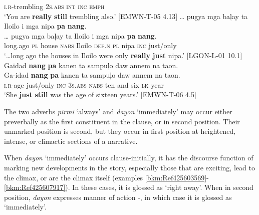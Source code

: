 {} \textsc{i.r}-trembling  2\textsc{s.abs}  \textsc{int}  \textsc{inc}  \textsc{emph} \\
\glt ‘You are \textbf{really} \textbf{still} trembling also.’ [EMWN-T-05 4.13]
\z
\ea
… pugya  mga  baļay  ta  Iloilo  i  mga  nipa  \textbf{pa}  \textbf{nang}. \\\smallskip
 \gll … pugya  mga  baļay  ta  Iloilo  i  mga  nipa  \textbf{pa}  \textbf{nang}. \\
 {} long.ago  \textsc{pl}  house  \textsc{nabs}  Iloilo  \textsc{def.n}  \textsc{pl}  nipa  \textsc{inc}  just/only \\
\glt ‘…long ago the houses in Iloilo were only \textbf{really} \textbf{just} nipa.’ [LGON-L-01 10.1]
\z
\ea
Gaidad  \textbf{nang}  \textbf{pa}  kanen  ta  sampuļo  daw  annem  na  taon. \\\smallskip
 \gll Ga-idad  \textbf{nang}  \textbf{pa}  kanen  ta  sampuļo  daw  annem  na  taon. \\
\textsc{i.r}-age  just/only  \textsc{inc}  3\textsc{s.abs}  \textsc{nabs}  ten  and  six    \textsc{lk}  year \\
\glt ‘She \textbf{just} \textbf{still} was the age of sixteen years.’ [EMWN-T-06 4.5]
\z

The two adverbs \textit{pirmi} ‘always’ and \textit{dayon} ‘immediately’ may occur either preverbally as the first constituent in the clause, or in second position. Their unmarked position is second, but they occur in first position at heightened, intense, or climactic sections of a narrative.

When \textit{dayon} ‘immediately’ occurs clause-initially, it has the discourse function of marking new developments in the story, especially those that are exciting, lead to the climax, or are the climax itself (examples \ref{bkm:Ref425603569}{}-\ref{bkm:Ref425607917}). In these cases, it is glossed as ‘right away’. When in second position, \textit{dayon} expresses manner of action -, in which case it is glossed as ‘immediately’.

